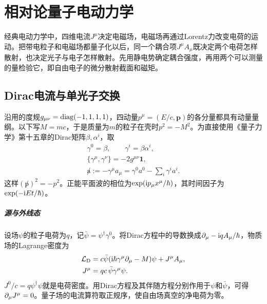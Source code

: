 \chapter{相对论量子电动力学}
\label{chap:relativistic qed}

经典电动力学中，四维电流$J^\mu$决定电磁场，电磁场再通过Lorentz力改变电荷的运动。把带电粒子和电磁场都量子化以后，同一个耦合项$J^\mu A_\mu$既决定两个电荷怎样散射，也决定光子与电子怎样散射。先用静电势确定耦合强度，再用两个可以测量的量检验它，即自由电子的微分散射截面和磁矩。

\section{Dirac电流与单光子交换}

沿用的度规$g_{\mu\nu} = \operatorname{diag}(-1,1,1,1)$，四动量$p^\mu = (E/c,\bm p)$的各分量都具有动量量纲。以下写$M = mc$，于是质量为$m$的粒子在壳时$p^2 = -M^2$。为直接使用《量子力学》第十五章的Dirac矩阵$\beta,\alpha^i$，取
\begin{gather*}
    \gamma^0 = \beta,\qquad \gamma^i = \beta\alpha^i,\\
    \{\gamma^\mu,\gamma^\nu\} = -2g^{\mu\nu}\mathbf1,\\
    \not a := -\gamma^\mu a_\mu = \gamma^0a^0 - \sum_i\gamma^i a^i .
\end{gather*}
这样$(\not p)^2 = -p^2$。正能平面波的相位为$\exp(\mathrm{i} p_\mu x^\mu/\hbar)$，其时间因子为$\exp(-\mathrm{i} Et/\hbar)$。

\paragraph{源与外线态}
设场$\psi$的粒子电荷为$q$，记$\bar\psi = \psi^\dagger\gamma^0$。将Dirac方程中的导数换成$\partial_\mu - \mathrm{i} q A_\mu/\hbar$，物质场的Lagrange密度为
\begin{subequations}
    \label{eq:ed-dirac-field-current}
    \begin{align}
        \mathcal L_\mathrm{D}
        &= c\bar\psi(\mathrm{i}\hbar\gamma^\mu\partial_\mu - M)\psi + J^\mu A_\mu,\\
        J^\mu &= qc\,\bar\psi\gamma^\mu\psi .
    \end{align}
\end{subequations}
$J^0/c = q\psi^\dagger\psi$就是电荷密度。用Dirac方程及其伴随方程分别作用于$\psi$和$\bar\psi$，可得$\partial_\mu J^\mu = 0$。量子场的电流算符取正规序，使自由场真空的净电荷为零。

